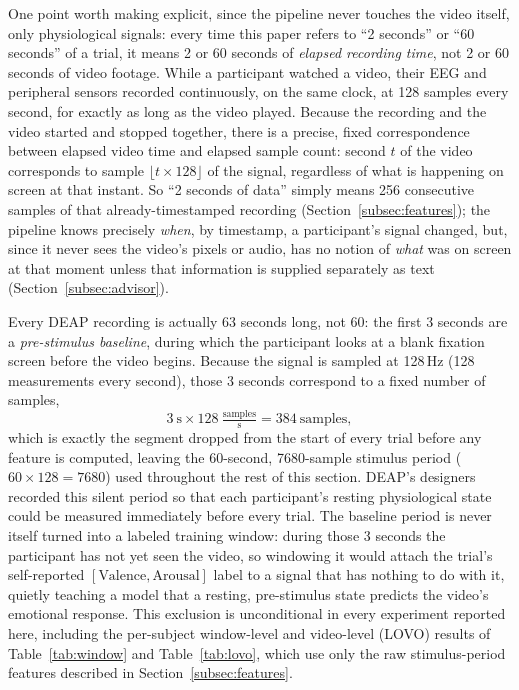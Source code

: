 \documentclass[conference]{IEEEtran}
\begin{document}
One point worth making explicit, since the pipeline never touches the
video itself, only physiological signals: every time this paper refers to
``2 seconds'' or ``60 seconds'' of a trial, it means 2 or 60 seconds of
\emph{elapsed recording time}, not 2 or 60 seconds of video footage. While
a participant watched a video, their EEG and peripheral sensors recorded
continuously, on the same clock, at 128 samples every second, for exactly
as long as the video played. Because the recording and the video started
and stopped together, there is a precise, fixed correspondence between
elapsed video time and elapsed sample count: second $t$ of the video
corresponds to sample $\lfloor t \times 128 \rfloor$ of the signal,
regardless of what is happening on screen at that instant. So ``2 seconds
of data'' simply means 256 consecutive samples of that already-timestamped
recording (Section~\ref{subsec:features}); the pipeline knows precisely
\emph{when}, by timestamp, a participant's signal changed, but, since it
never sees the video's pixels or audio, has no notion of \emph{what} was
on screen at that moment unless that information is supplied separately
as text (Section~\ref{subsec:advisor}).

Every DEAP recording is actually 63 seconds long, not 60: the first 3
seconds are a \emph{pre-stimulus baseline}, during which the participant
looks at a blank fixation screen before the video begins. Because the
signal is sampled at 128\,Hz (128 measurements every second), those 3
seconds correspond to a fixed number of samples,
\begin{equation}
3\ \text{s} \times 128\ \tfrac{\text{samples}}{\text{s}} = 384\ \text{samples},
\label{eq:baseline}
\end{equation}
which is exactly the segment dropped from the start of every trial before
any feature is computed, leaving the 60-second, 7680-sample stimulus
period ($60 \times 128 = 7680$) used throughout the rest of this section.
DEAP's designers recorded this silent period so that each participant's
resting physiological state could be measured immediately before every
trial. The baseline period is never itself turned into a labeled training
window: during those 3 seconds the participant has not yet seen the
video, so windowing it would attach the trial's self-reported
$[\text{Valence}, \text{Arousal}]$ label to a signal that has nothing to
do with it, quietly teaching a model that a resting, pre-stimulus state
predicts the video's emotional response. This exclusion is unconditional
in every experiment reported here, including the per-subject window-level
and video-level (LOVO) results of Table~\ref{tab:window} and
Table~\ref{tab:lovo}, which use only the raw stimulus-period features
described in Section~\ref{subsec:features}.
\end{document}
